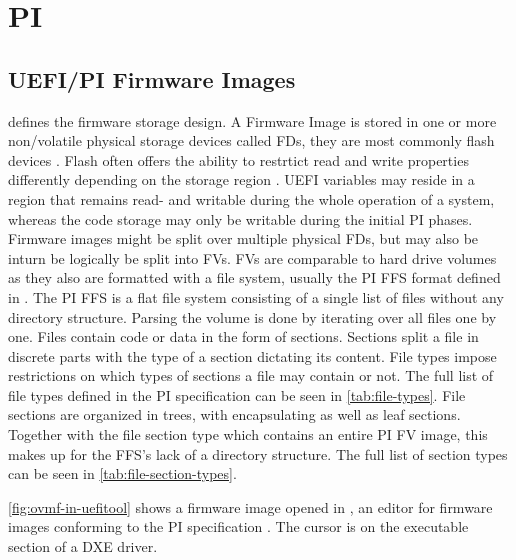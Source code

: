 
\section{\acf{PI}}


\subsection{\acs{UEFI}/\acs{PI} Firmware Images}

\cite[Vol. 3, Section 2]{pi-spec} defines the firmware storage design.
A Firmware Image is stored in one or more non\-/volatile physical storage devices called \acp{FD}, they are most commonly flash devices \cite[Vol. 3, Section 2.1]{pi-spec}.
Flash often offers the ability to restrtict read and write properties differently depending on the storage region \cite[Vol. 3, Section 2.1.1]{pi-spec}.
\ac{UEFI} variables may reside in a region that remains read- and writable during the whole operation of a system, whereas the code storage may only be writable during the initial \ac{PI} phases.
Firmware images might be split over multiple physical \acp{FD}, but may also be inturn be logically be split into \acp{FV}.
\acp{FV} are comparable to hard drive volumes as they also are formatted with a file system, usually the \ac{PI} \ac{FFS} format defined in \cite[Vol. 3, Section 2.2]{pi-spec}.
The \ac{PI} \ac{FFS} is a flat file system consisting of a single list of files without any directory structure.
Parsing the volume is done by iterating over all files one by one.
Files contain code or data in the form of sections.
Sections split a file in discrete parts with the type of a section dictating its content.
File types impose restrictions on which types of sections a file may contain or not.
The full list of file types defined in the \ac{PI} specification can be seen in \autoref{tab:file-types}.
File sections are organized in trees, with encapsulating as well as leaf sections.
Together with the file section type  which contains an entire \ac{PI} \ac{FV} image, this makes up for the \ac{FFS}'s lack of a directory structure.
The full list of section types can be seen in \autoref{tab:file-section-types}.

\autoref{fig:ovmf-in-uefitool} shows a firmware image opened in , an editor for firmware images conforming to the \ac{PI} specification \cite{uefitool}.
The cursor is on the executable section of a \acs{DXE} driver.


